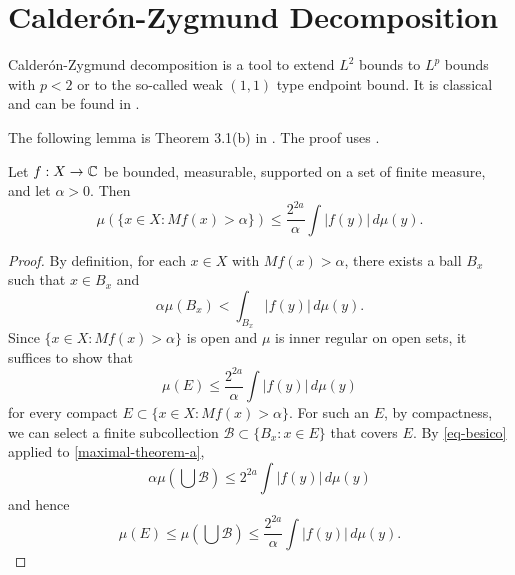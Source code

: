 \section{Calder\'on-Zygmund Decomposition}
\label{subsec-CZD}
Calder\'on-Zygmund decomposition is a tool to extend $L^2$ bounds to $L^p$ bounds with $p<2$ or to the so-called weak $(1, 1)$ type endpoint bound.
It is classical and can be found in \cite{stein-book}.

The following lemma is Theorem 3.1(b) in \cite{stein-book}. The proof uses .
\begin{lemma}
    \label{maximal-theorem}
    \leanok
    Let $f: X \to \mathbb{C}$ be bounded, measurable, supported on a set of finite measure, and let $\alpha > 0$. Then
    \begin{equation}
        \label{maximal-theorem-equation}
        \mu(\{x\in X : Mf(x) > \alpha\}) \le \frac{2^{2a}}{\alpha} \int |f(y)|\, d\mu(y).
    \end{equation}
\end{lemma}
\begin{proof}
    \leanok
    By definition, for each $x\in X$ with $Mf(x) > \alpha$, there exists a ball $B_x$ such that $x\in B_x$ and
    \begin{equation}
        \label{maximal-theorem-a}
        \alpha \mu(B_x) < \int_{B_x} |f(y)|\, d\mu(y).
    \end{equation}
    Since $\{x\in X : Mf(x) > \alpha\}$ is open and $\mu$ is inner regular on open sets, it suffices to show that
    \begin{equation*}
        \mu(E) \le \frac{2^{2a}}{\alpha} \int |f(y)|\, d\mu(y)
    \end{equation*}
    for every compact $E\subset \{x\in X : Mf(x) > \alpha\}$.
    For such an $E$, by compactness, we can select a finite subcollection $\mathcal{B} \subset \{B_x: x\in E\}$ that covers $E$.
    By \eqref{eq-besico} applied to \eqref{maximal-theorem-a},
    \begin{equation}
        \alpha \mu(\bigcup \mathcal{B}) \le 2^{2a} \int |f(y)|\,d\mu(y)
    \end{equation}
    and hence
    \begin{equation*}
        \mu(E) \le \mu(\bigcup \mathcal{B}) \le \frac{2^{2a}}{\alpha} \int |f(y)|\,d\mu(y).
    \end{equation*}
\end{proof}

